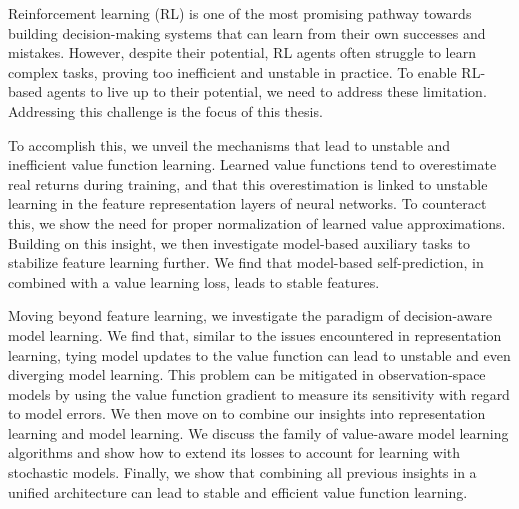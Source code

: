 Reinforcement learning (RL) is one of the most promising pathway towards building decision-making systems that can learn from their own successes and mistakes.
However, despite their potential, RL agents often struggle to learn complex tasks, proving too inefficient and unstable in practice.
To enable RL-based agents to live up to their potential, we need to address these limitation.
Addressing this challenge is the focus of this thesis.

To accomplish this, we unveil the mechanisms that lead to unstable and inefficient value function learning.
Learned value functions tend to overestimate real returns during training, and that this overestimation is linked to unstable learning in the feature representation layers of neural networks.
To counteract this, we show the need for proper normalization of learned value approximations.
Building on this insight, we then investigate model-based auxiliary tasks to stabilize feature learning further.
We find that model-based self-prediction, in combined with a value learning loss, leads to stable features.

Moving beyond feature learning, we investigate the paradigm of decision-aware model learning.
We find that, similar to the issues encountered in representation learning, tying model updates to the value function can lead to unstable and even diverging model learning.
This problem can be mitigated in observation-space models by using the value function gradient to measure its sensitivity with regard to model errors.
We then move on to combine our insights into representation learning and model learning.
We discuss the family of value-aware model learning algorithms and show how to extend its losses to account for learning with stochastic models.
Finally, we show that combining all previous insights in a unified architecture can lead to stable and efficient value function learning.